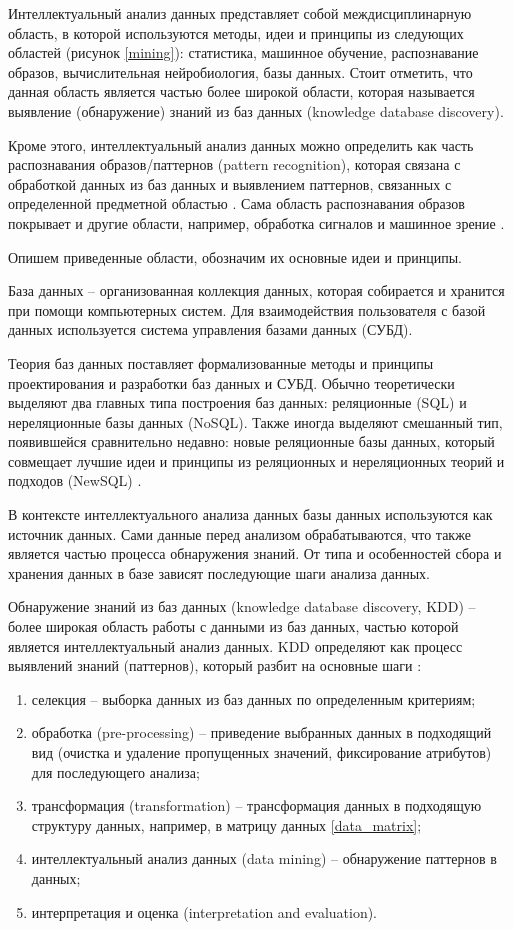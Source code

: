Интеллектуальный анализ данных представляет собой междисциплинарную область,
в которой используются методы, идеи и принципы из следующих областей (рисунок \ref{mining}):
статистика, машинное обучение, распознавание образов,
вычислительная нейробиология, базы данных.
Стоит отметить, что данная область является частью более широкой области, 
которая называется выявление (обнаружение) знаний из баз данных (knowledge database discovery).

Кроме этого, интеллектуальный анализ данных можно определить как часть
распознавания образов/паттернов (pattern recognition),
которая связана с обработкой данных из баз данных и выявлением паттернов, 
связанных с определенной предметной областью \cite{mirkin-mining} .
Сама область распознавания образов покрывает и другие области, например,
обработка сигналов и машинное зрение \cite{mehmed-mining} .

Опишем приведенные области, обозначим их основные идеи и принципы.

База данных -- организованная коллекция данных, которая собирается и хранится
при помощи компьютерных систем.
Для взаимодействия пользователя с базой данных используется
система управления базами данных (СУБД).

Теория баз данных поставляет формализованные методы и принципы проектирования и разработки баз данных и СУБД.
Обычно теоретически выделяют два главных типа построения баз данных: реляционные (SQL) и нереляционные базы данных (NoSQL).
Также иногда выделяют смешанный тип, появившейся сравнительно недавно:
новые реляционные базы данных, который совмещает лучшие
идеи и принципы из реляционных и нереляционных теорий и подходов (NewSQL) \cite{fauler-db} .

В контексте интеллектуального анализа данных базы данных используются как источник данных.
Сами данные перед анализом обрабатываются, что также является частью процесса обнаружения знаний.
От типа и особенностей сбора и хранения данных в базе зависят последующие шаги анализа данных.

Обнаружение знаний из баз данных (knowledge database discovery, KDD) --  более широкая область
работы с данными из баз данных, частью которой является интеллектуальный анализ данных.
KDD определяют как процесс выявлений знаний (паттернов), который разбит на основные шаги  \cite{curr} :

\begin{enumerate}
    \item селекция -- выборка данных из баз данных по определенным критериям;
    \item обработка (pre-processing) -- приведение выбранных данных в подходящий вид 
    (очистка и удаление пропущенных значений, фиксирование атрибутов) для последующего анализа;
    \item трансформация (transformation) -- трансформация данных в подходящую структуру данных, например, в матрицу данных \eqref{data_matrix};
    \item интеллектуальный анализ данных (data mining) -- обнаружение паттернов в данных;
    \item интерпретация и оценка (interpretation and evaluation).
\end{enumerate}

